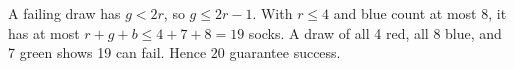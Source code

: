 A failing draw has $g<2r$, so $g\le2r-1$. With $r\le4$ and blue count at most 8, it has at most $r+g+b\le4+7+8=19$ socks. A draw of all 4 red, all 8 blue, and 7 green shows 19 can fail. Hence $\boxed{20}$ guarantee success.

